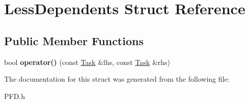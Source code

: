 \hypertarget{structLessDependents}{\section{Less\-Dependents Struct Reference}
\label{structLessDependents}
}
\subsection*{Public Member Functions}
\begin{DoxyCompactItemize}
\item 
\hypertarget{structLessDependents_a7ec6125383a16aa3e4f637873d13a81d}{bool {\bfseries operator()} (const \hyperlink{structTask}{Task} \&lhs, const \hyperlink{structTask}{Task} \&rhs)}\label{structLessDependents_a7ec6125383a16aa3e4f637873d13a81d}

\end{DoxyCompactItemize}


The documentation for this struct was generated from the following file\-:\begin{DoxyCompactItemize}
\item 
P\-F\-D.\-h\end{DoxyCompactItemize}
